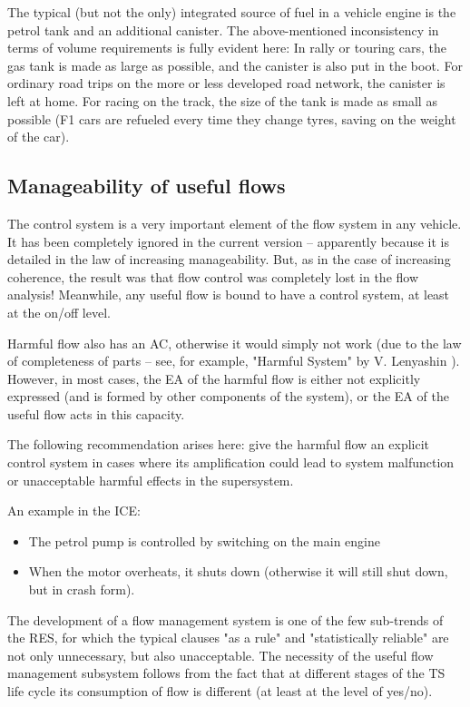 \documentclass[a4paper,11pt]{article}
\begin{document}
The typical (but not the only) integrated source of fuel in a vehicle engine
is the petrol tank and an additional canister. The above-mentioned
inconsistency in terms of volume requirements is fully evident here: In rally
or touring cars, the gas tank is made as large as possible, and the canister
is also put in the boot. For ordinary road trips on the more or less developed
road network, the canister is left at home. For racing on the track, the size
of the tank is made as small as possible (F1 cars are refueled every time they
change tyres, saving on the weight of the car).

\subsection{Manageability of useful flows}

The control system is a very important element of the flow system in any
vehicle. It has been completely ignored in the current version -- apparently
because it is detailed in the law of increasing manageability. But, as in the
case of increasing coherence, the result was that flow control was completely
lost in the flow analysis! Meanwhile, any useful flow is bound to have a
control system, at least at the on/off level.

Harmful flow also has an AC, otherwise it would simply not work (due to the
law of completeness of parts -- see, for example, "Harmful System" by
V. Lenyashin \cite{B20}). However, in most cases, the EA of the harmful flow
is either not explicitly expressed (and is formed by other components of the
system), or the EA of the useful flow acts in this capacity.

The following recommendation arises here: give the harmful flow an explicit
control system in cases where its amplification could lead to system
malfunction or unacceptable harmful effects in the supersystem.

An example in the ICE:
\begin{itemize}
\item The petrol pump is controlled by switching on the main engine
\item When the motor overheats, it shuts down (otherwise it will still shut
  down, but in crash form).
\end{itemize}
The development of a flow management system is one of the few sub-trends of
the RES, for which the typical clauses "as a rule" and "statistically
reliable" are not only unnecessary, but also unacceptable. The necessity of
the useful flow management subsystem follows from the fact that at different
stages of the TS life cycle its consumption of flow is different (at least at
the level of yes/no).
\end{document}
